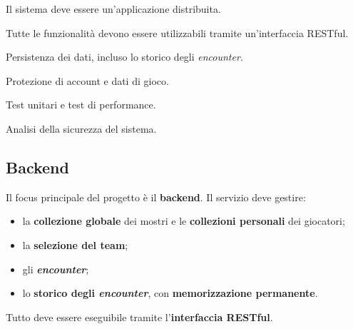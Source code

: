 \documentclass[11pt,a4paper]{article}
\newcommand{\enc}{\emph{encounter}}
\begin{document}
\begin{tcbraster}[raster columns=3,raster equal height,raster column skip=3mm,raster row skip=3mm]
  \begin{tcolorbox}[colback=accent!5,colframe=accent!70,title=Applicazione distribuita,fonttitle=\bfseries\small,arc=3pt]
    \small Il sistema deve essere un'applicazione distribuita.
  \end{tcolorbox}
  \begin{tcolorbox}[colback=accent!5,colframe=accent!70,title=Interfaccia REST,fonttitle=\bfseries\small,arc=3pt]
    \small Tutte le funzionalità devono essere utilizzabili tramite un'interfaccia RESTful.
  \end{tcolorbox}
  \begin{tcolorbox}[colback=accent!5,colframe=accent!70,title=Uno o più database,fonttitle=\bfseries\small,arc=3pt]
    \small Persistenza dei dati, incluso lo storico degli \enc.
  \end{tcolorbox}
  \begin{tcolorbox}[colback=accent!5,colframe=accent!70,title=Meccanismi di sicurezza,fonttitle=\bfseries\small,arc=3pt]
    \small Protezione di account e dati di gioco.
  \end{tcolorbox}
  \begin{tcolorbox}[colback=accent!5,colframe=accent!70,title=Testing,fonttitle=\bfseries\small,arc=3pt]
    \small Test unitari e test di performance.
  \end{tcolorbox}
  \begin{tcolorbox}[colback=accent!5,colframe=accent!70,title=Analisi di sicurezza,fonttitle=\bfseries\small,arc=3pt]
    \small Analisi della sicurezza del sistema.
  \end{tcolorbox}
\end{tcbraster}

\subsection{Backend}
Il focus principale del progetto è il \textbf{backend}. Il servizio deve gestire:
\begin{itemize}
  \item la \textbf{collezione globale} dei mostri e le \textbf{collezioni personali} dei giocatori;
  \item la \textbf{selezione del team};
  \item gli \textbf{\enc};
  \item lo \textbf{storico degli \enc}, con \textbf{memorizzazione permanente}.
\end{itemize}
Tutto deve essere eseguibile tramite l'\textbf{interfaccia RESTful}.
\end{document}
